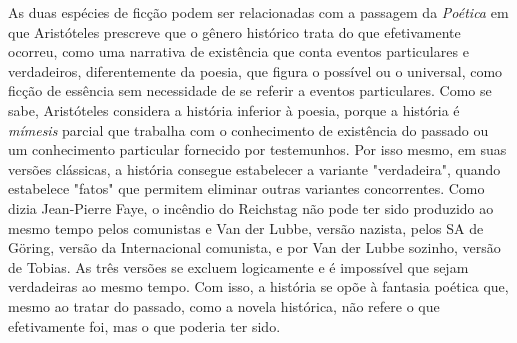 As duas espécies de ficção podem ser relacionadas com a passagem da
\emph{Poética} em que Aristóteles prescreve que o gênero histórico trata
do que efetivamente ocorreu, como uma narrativa de existência que conta
eventos particulares e verdadeiros, diferentemente da poesia, que figura
o possível ou o universal, como ficção de essência sem necessidade de se
referir a eventos particulares. Como se sabe, Aristóteles considera a
história inferior à poesia, porque a história é \emph{mímesis} parcial
que trabalha com o conhecimento de existência do passado ou um
conhecimento particular fornecido por testemunhos. Por isso mesmo, em
suas versões clássicas, a história consegue estabelecer a variante
"verdadeira", quando estabelece "fatos" que permitem eliminar outras
variantes concorrentes. Como dizia Jean-Pierre Faye, o incêndio do
Reichstag não pode ter sido produzido ao mesmo tempo pelos comunistas e
Van der Lubbe, versão nazista, pelos SA de Göring, versão da
Internacional comunista, e por Van der Lubbe sozinho, versão de Tobias.
As três versões se excluem logicamente e é impossível que sejam
verdadeiras ao mesmo tempo. Com isso, a história se opõe à fantasia
poética que, mesmo ao tratar do passado, como a novela histórica, não
refere o que efetivamente foi, mas o que poderia ter sido.


